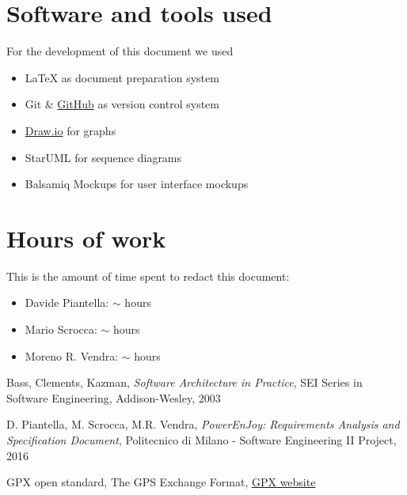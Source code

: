 \begin{appendices}

	\section{Software and tools used}
	For the development of this document we used
	\begin{itemize}
		\item \LaTeX{} as document preparation system
		\item Git \& \href{http://github.com}{GitHub} as version control system
		\item \href{http://draw.io}{Draw.io} for graphs 
		\item StarUML for sequence diagrams
		\item Balsamiq Mockups for user interface mockups
	\end{itemize}
	
	\section{Hours of work}
	This is the amount of time spent to redact this document:
	\begin{itemize}
		\item Davide Piantella: $\sim$ hours
		\item Mario Scrocca: $\sim$ hours
		\item Moreno R. Vendra: $\sim$ hours
	\end{itemize}
	
\end{appendices}


\begin{thebibliography}{9}

Bass, Clements, Kazman, \emph{Software Architecture in Practice}, SEI Series in Software Engineering, Addison-­Wesley, 2003

D. Piantella, M. Scrocca, M.R. Vendra, \emph{PowerEnJoy: Requirements Analysis and Specification Document}, Politecnico di Milano - Software Engineering II Project, 2016

GPX open standard, The GPS Exchange Format, \href{http://www.topografix.com/gpx.asp}{GPX website}
\end{thebibliography}